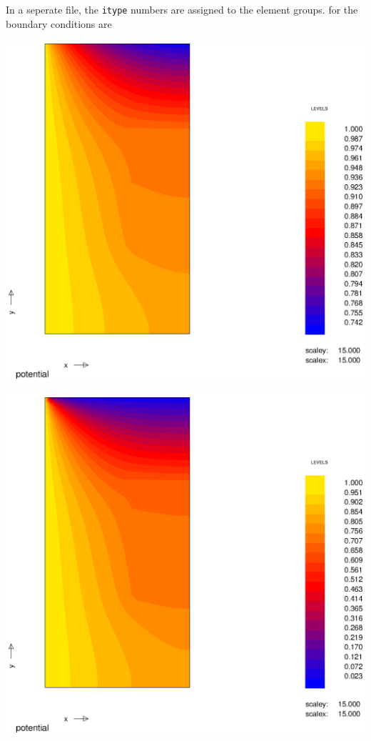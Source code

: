 In a seperate file,  the \texttt{itype} numbers are assigned to the element groups. for the boundary conditions are 

\begin{Figure}
 \centerfloat
 \includegraphics[width=0.8\linewidth]{coef_001.eps}
 \label{fig:coef_0.01}
\end{Figure}

\begin{Figure}
 \centerfloat
 \includegraphics[width=0.8\linewidth]{coef_10.eps}
 \label{fig:coef_10}
\end{Figure}